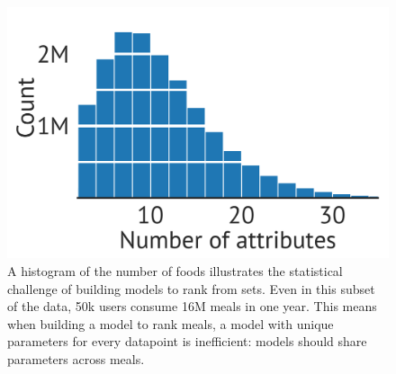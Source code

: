 \begin{figure}[t!]
  \centering
  \includegraphics[width=0.6\linewidth]{fig/hist_meals}
  \caption{A histogram of the number of foods illustrates the statistical
    challenge of building models to rank from sets. Even in this subset of the
    data, 50k users consume 16M meals in one year. This means when building a
    model to rank meals, a model with unique parameters for every datapoint is
    inefficient: models should share parameters across meals.}
  \label{fig:hist}
\end{figure}


